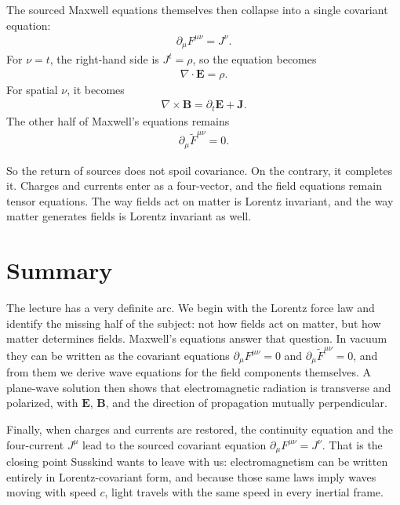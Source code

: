 The sourced Maxwell equations themselves then collapse into a single covariant equation:
\begin{align}
\partial_\mu F^{\mu\nu} = J^\nu.
\end{align}
For \(\nu=t\), the right-hand side is \(J^t=\rho\), so the equation becomes
\begin{align}
\nabla \cdot \mathbf E = \rho.
\end{align}
For spatial \(\nu\), it becomes
\begin{align}
\nabla \times \mathbf B = \partial_t \mathbf E + \mathbf J.
\end{align}
The other half of Maxwell's equations remains
\begin{align}
\partial_\mu \tilde F^{\mu\nu} = 0.
\end{align}

So the return of sources does not spoil covariance. On the contrary, it completes it. Charges and currents enter as a four-vector, and the field equations remain tensor equations. The way fields act on matter is Lorentz invariant, and the way matter generates fields is Lorentz invariant as well.

\section{Summary}

The lecture has a very definite arc. We begin with the Lorentz force law and identify the missing half of the subject: not how fields act on matter, but how matter determines fields. Maxwell's equations answer that question. In vacuum they can be written as the covariant equations \(\partial_\mu F^{\mu\nu}=0\) and \(\partial_\mu \tilde F^{\mu\nu}=0\), and from them we derive wave equations for the field components themselves. A plane-wave solution then shows that electromagnetic radiation is transverse and polarized, with \(\mathbf E\), \(\mathbf B\), and the direction of propagation mutually perpendicular.

Finally, when charges and currents are restored, the continuity equation and the four-current \(J^\mu\) lead to the sourced covariant equation \(\partial_\mu F^{\mu\nu}=J^\nu\). That is the closing point Susskind wants to leave with us: electromagnetism can be written entirely in Lorentz-covariant form, and because those same laws imply waves moving with speed \(c\), light travels with the same speed in every inertial frame.